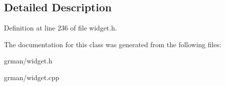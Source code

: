 \subsection{Detailed Description}


Definition at line 236 of file widget.\+h.



The documentation for this class was generated from the following files\+:\begin{DoxyCompactItemize}
\item 
grman/widget.\+h\item 
grman/widget.\+cpp\end{DoxyCompactItemize}
